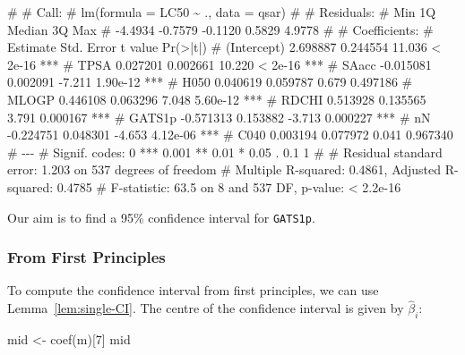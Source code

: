 \documentclass[
  a4paper,
]{article}
\newenvironment{Shaded}{\begin{snugshade}}{\end{snugshade}}
\newcommand{\DecValTok}[1]{\textcolor[rgb]{0.00,0.00,0.81}{#1}}
\newcommand{\FunctionTok}[1]{\textcolor[rgb]{0.00,0.00,0.00}{#1}}
\newcommand{\NormalTok}[1]{#1}
\newcommand{\OtherTok}[1]{\textcolor[rgb]{0.56,0.35,0.01}{#1}}
\theoremstyle{definition}
\theoremstyle{definition}
\theoremstyle{definition}
\theoremstyle{definition}
\theoremstyle{remark}
\begin{document}
\begin{Shaded}
\begin{Highlighting}[]
\NormalTok{\# }
\NormalTok{\# Call:}
\NormalTok{\# lm(formula = LC50 \textasciitilde{} ., data = qsar)}
\NormalTok{\# }
\NormalTok{\# Residuals:}
\NormalTok{\#     Min      1Q  Median      3Q     Max }
\NormalTok{\# {-}4.4934 {-}0.7579 {-}0.1120  0.5829  4.9778 }
\NormalTok{\# }
\NormalTok{\# Coefficients:}
\NormalTok{\#              Estimate Std. Error t value Pr(\textgreater{}|t|)    }
\NormalTok{\# (Intercept)  2.698887   0.244554  11.036  \textless{} 2e{-}16 ***}
\NormalTok{\# TPSA         0.027201   0.002661  10.220  \textless{} 2e{-}16 ***}
\NormalTok{\# SAacc       {-}0.015081   0.002091  {-}7.211 1.90e{-}12 ***}
\NormalTok{\# H050         0.040619   0.059787   0.679 0.497186    }
\NormalTok{\# MLOGP        0.446108   0.063296   7.048 5.60e{-}12 ***}
\NormalTok{\# RDCHI        0.513928   0.135565   3.791 0.000167 ***}
\NormalTok{\# GATS1p      {-}0.571313   0.153882  {-}3.713 0.000227 ***}
\NormalTok{\# nN          {-}0.224751   0.048301  {-}4.653 4.12e{-}06 ***}
\NormalTok{\# C040         0.003194   0.077972   0.041 0.967340    }
\NormalTok{\# {-}{-}{-}}
\NormalTok{\# Signif. codes:  0 \textquotesingle{}***\textquotesingle{} 0.001 \textquotesingle{}**\textquotesingle{} 0.01 \textquotesingle{}*\textquotesingle{} 0.05 \textquotesingle{}.\textquotesingle{} 0.1 \textquotesingle{} \textquotesingle{} 1}
\NormalTok{\# }
\NormalTok{\# Residual standard error: 1.203 on 537 degrees of freedom}
\NormalTok{\# Multiple R{-}squared:  0.4861,  Adjusted R{-}squared:  0.4785 }
\NormalTok{\# F{-}statistic:  63.5 on 8 and 537 DF,  p{-}value: \textless{} 2.2e{-}16}
\end{Highlighting}
\end{Shaded}

Our aim is to find a 95\% confidence interval for \texttt{GATS1p}.

\hypertarget{from-first-principles}{%
\subsubsection{From First Principles}\label{from-first-principles}}

To compute the confidence interval from first principles,
we can use Lemma~\ref{lem:single-CI}. The centre of the confidence
interval is given by \(\hat\beta_i\):

\begin{Shaded}
\begin{Highlighting}[]
\NormalTok{mid }\OtherTok{\textless{}{-}} \FunctionTok{coef}\NormalTok{(m)[}\DecValTok{7}\NormalTok{]}
\NormalTok{mid}
\end{Highlighting}
\end{Shaded}
\end{document}

